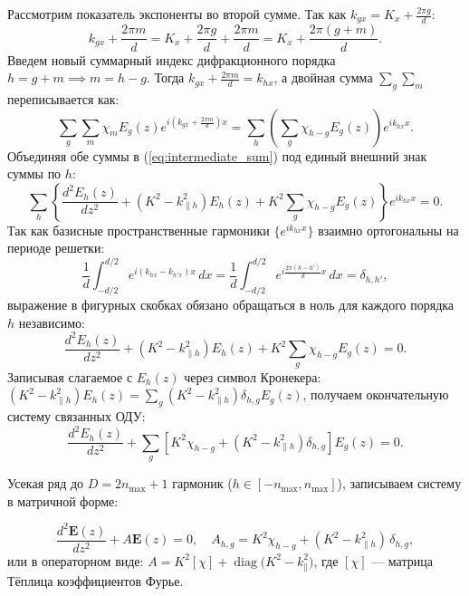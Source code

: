\documentclass[a4paper,11pt]{article}
\begin{document}
Рассмотрим показатель экспоненты во второй сумме. Так как $k_{gx} = K_x + \frac{2\pi g}{d}$:
\begin{equation}
    k_{gx} + \frac{2\pi m}{d} = K_x + \frac{2\pi g}{d} + \frac{2\pi m}{d} = K_x + \frac{2\pi(g + m)}{d}.
\end{equation}
Введем новый суммарный индекс дифракционного порядка $h = g + m \implies m = h - g$. Тогда $k_{gx} + \frac{2\pi m}{d} = k_{hx}$, а двойная сумма $\sum_g \sum_m$ переписывается как:
\begin{equation}
    \sum_g \sum_m \chi_m E_g(z) e^{i \left( k_{gx} + \frac{2\pi m}{d} \right) x} = \sum_h \left( \sum_g \chi_{h-g} E_g(z) \right) e^{i k_{hx} x}.
\end{equation}
Объединяя обе суммы в (\ref{eq:intermediate_sum}) под единый внешний знак суммы по $h$:
\begin{equation}
    \sum_h \left\{ \frac{d^2 E_h(z)}{dz^2} + (K^2 - k_{\parallel h}^2) E_h(z) + K^2 \sum_g \chi_{h-g} E_g(z) \right\} e^{i k_{hx} x} = 0.
\end{equation}
Так как базисные пространственные гармоники $\{e^{i k_{hx} x}\}$ взаимно ортогональны на периоде решетки:
\begin{equation}
    \frac{1}{d} \int_{-d/2}^{d/2} e^{i (k_{hx} - k_{h'x}) x} \, dx = \frac{1}{d} \int_{-d/2}^{d/2} e^{i \frac{2\pi(h - h')}{d} x} \, dx = \delta_{h, h'},
\end{equation}
выражение в фигурных скобках обязано обращаться в ноль для каждого порядка $h$ независимо:
\begin{equation}
    \frac{d^2 E_h(z)}{dz^2} + (K^2 - k_{\parallel h}^2) E_h(z) + K^2 \sum_g \chi_{h-g} E_g(z) = 0.
\end{equation}
Записывая слагаемое с $E_h(z)$ через символ Кронекера: $(K^2 - k_{\parallel h}^2) E_h(z) = \sum_g (K^2 - k_{\parallel h}^2) \delta_{h, g} E_g(z)$, получаем окончательную систему связанных ОДУ:
\begin{equation}
    \frac{d^2 E_h(z)}{dz^2} + \sum_g \left[ K^2 \chi_{h-g} + (K^2 - k_{\parallel h}^2) \delta_{h, g} \right] E_g(z) = 0.
    \label{eq:coupled_diff_eq}
\end{equation}

Усекая ряд до $D = 2n_{\max} + 1$ гармоник ($h \in [-n_{\max}, n_{\max}]$), записываем систему в матричной форме:
\begin{mathbox}
\begin{equation}
    \frac{d^2 \mathbf{E}(z)}{dz^2} + A \mathbf{E}(z) = 0, \quad A_{h, g} = K^2 \chi_{h-g} + (K^2 - k_{\parallel h}^2) \, \delta_{h, g},
    \label{eq:matrix_A}
\end{equation}
или в операторном виде: $A = K^2 [\chi] + \operatorname{diag}\big(K^2 - k_{\parallel}^2\big)$, где $[\chi]$ — матрица Тёплица коэффициентов Фурье.
\end{mathbox}
\end{document}
